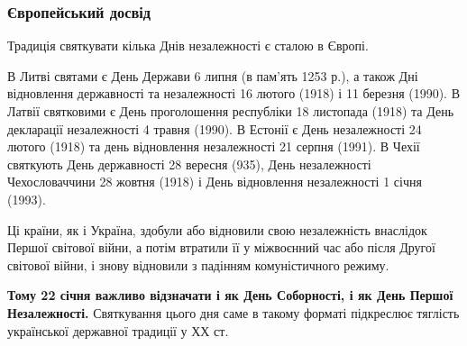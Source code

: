  
 
 
 
 

\subsubsection{Європейський досвід}

Традиція святкувати кілька Днів незалежності є сталою в Європі.

В Литві святами є День Держави 6 липня (в пам'ять 1253 р.), а також Дні
відновлення державності та незалежності 16 лютого (1918) і 11 березня (1990). В
Латвії святковими є День проголошення республіки 18 листопада (1918) та День
декларації незалежності 4 травня (1990). В Естонії є День незалежності 24
лютого (1918) та день відновлення незалежності 21 серпня (1991). В Чехії
святкують День державності 28 вересня (935), День незалежності Чехословаччини
28 жовтня (1918) і День відновлення незалежності 1 січня (1993).

Ці країни, як і Україна, здобули або відновили свою незалежність внаслідок
Першої світової війни, а потім втратили її у міжвоєнний час або після Другої
світової війни, і знову відновили з падінням комуністичного режиму.

\textbf{Тому 22 січня важливо відзначати і як День Соборності, і як День Першої
Незалежності.} Святкування цього дня саме в такому форматі підкреслює тяглість
української державної традиції у ХХ ст.

